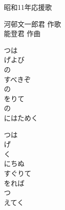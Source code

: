 \documentclass[10pt,b5j]{tarticle} %
\begin{document}
\begin{minipage}[c]{0.7\hsize} %
    \begin{center}
        {\LARGE
            昭和11年応援歌 %
        }
        {\small 
        }
    \end{center}
\end{minipage}
\begin{minipage}[c]{0.3\hsize} %
    \begin{flushright} %
        河邨文一郎君 作歌\\能登君 作曲 %
    \end{flushright}
\end{minipage}

\vspace{1.5em} %
\newcommand{\linespace}{0.5em} %
\newcommand{\blocksize}{0.5\hsize} %
\begin{enumerate} %
    \begin{minipage}[c]{\blocksize}
    
        \vspace{\linespace}
        \item
        つは\\
        げよび\\
        の\\
        すべきぞ\\
        の\\
        をりて\\
        の\\
        にはためく
        
        \vspace{\linespace}
        \item
        つは\\
        げ\\
        く\\
        にちぬ\\
        すぐりて\\
        をれば\\
        つ\\
        えてく
    
    \end{minipage}
\end{enumerate} %
\end{document}
